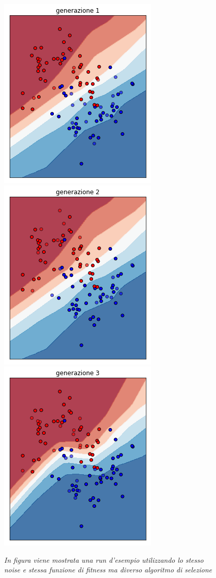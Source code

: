 \documentclass[12pt,a4paper]{report}
\begin{document}
\begin{figure}[H]
 \centering
 \includegraphics[scale = 0.4]{images/moons-sons-acc./1}
 \includegraphics[scale = 0.4]{images/moons-sons-acc./2}
 \includegraphics[scale = 0.4]{images/moons-sons-acc./3}
 \caption{\textit{In figura viene mostrata una run d'esempio utilizzando lo stesso noise e stessa funzione di fitness ma diverso algoritmo di selezione}}
 \label{moons2}
\end{figure}
\end{document}
